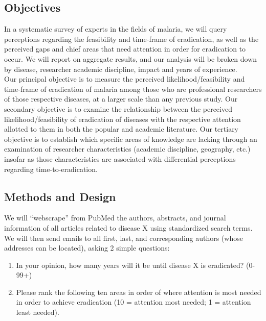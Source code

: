 \documentclass{article}
\begin{document}
\subsection*{Objectives}


In a systematic survey of experts in the fields of malaria, we will query perceptions regarding the feasibility and time-frame of eradication, as well as the perceived gaps and chief areas that need attention in order for eradication to occur. We will report on aggregate results, and our analysis will be broken down by disease, researcher academic discipline, impact and years of experience. \\


\noindent Our principal objective is to measure the perceived likelihood/feasibility and time-frame of eradication of malaria among those who are professional researchers of those respective diseases, at a larger scale than any previous study. Our secondary objective is to examine the relationship between the perceived likelihood/feasibility of eradication of diseases with the respective attention allotted to them in both the popular and academic literature. Our tertiary objective is to establish which specific areas of knowledge are lacking through an examination of researcher characteristics (academic discipline, geography, etc.) insofar as those characteristics are associated with differential perceptions regarding time-to-eradication.


\subsection*{Methods and Design}

We will “webscrape” from PubMed the authors, abstracts, and journal information of all articles related to disease X using standardized search terms. We will then send emails to all first, last, and corresponding authors (whose addresses can be located), asking 2 simple questions:  
\begin{enumerate}
\item In your opinion, how many years will it be until disease X is eradicated? (0-99+)
\item Please rank the following ten areas in order of where attention is most needed in order to achieve eradication (10 = attention most needed; 1 = attention least needed).
\end{enumerate}
\end{document}
